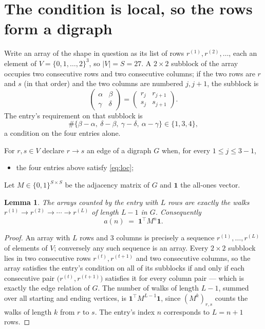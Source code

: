 \documentclass[11pt,a4paper]{article}
\theoremstyle{plain}
\newtheorem{lemma}[theorem]{Lemma}
\theoremstyle{definition}
\begin{document}
\section{The condition is local, so the rows form a digraph}

Write an array of the shape in question as its list of rows
$r^{(1)},r^{(2)},\dots$, each an element of
$V=\{0,1,\dots,2\}^{3}$, so $|V|=S=27$. A $2\times2$ subblock of the array
occupies two consecutive rows and two consecutive columns; if the two rows are $r$
and $s$ (in that order) and the two columns are numbered $j,j+1$,
the subblock is
\[
\begin{pmatrix}\alpha&\beta\\\gamma&\delta\end{pmatrix}=\begin{pmatrix}r_j&r_{j+1}\\s_j&s_{j+1}\end{pmatrix}.
\]
The entry's requirement on that subblock is
\begin{equation}\label{eq:loc}
\#\{\beta-\alpha,\ \delta-\beta,\ \gamma-\delta,\ \alpha-\gamma\}\in\{1,3,4\},
\end{equation}
a condition on the four entries alone.

For $r,s\in V$ declare $r\to s$ an edge of a digraph $G$ when, for every
$1\le j\le 3-1$,
\begin{itemize}
\item the four entries above satisfy \eqref{eq:loc};

\end{itemize}
Let $M\in\{0,1\}^{S\times S}$ be the adjacency matrix of $G$ and $\mathbf{1}$ the
all-ones vector.

\begin{lemma}\label{lem:walk}
The arrays counted by the entry with $L$ rows are exactly the walks
$r^{(1)}\to r^{(2)}\to\cdots\to r^{(L)}$ of length $L-1$ in $G$. Consequently
\[
a(n)\;=\;\mathbf{1}^{\!\top}M^{n}\mathbf{1} .
\]
\end{lemma}

\begin{proof}
An array with $L$ rows and $3$ columns is precisely a sequence
$r^{(1)},\dots,r^{(L)}$ of elements of $V$; conversely any such sequence is an array.
Every $2\times2$ subblock lies in two consecutive rows $r^{(t)},r^{(t+1)}$ and two
consecutive columns, so the array satisfies the entry's condition on all of its subblocks
if and only if each consecutive pair $\bigl(r^{(t)},r^{(t+1)}\bigr)$ satisfies it for
every column pair --- which is exactly the edge relation of $G$. The number of walks of
length $L-1$, summed over all starting and ending vertices, is
$\mathbf{1}^{\!\top}M^{L-1}\mathbf{1}$, since $(M^{k})_{r,s}$ counts the walks of
length $k$ from $r$ to $s$. The entry's index $n$ corresponds to $L=n+1$ rows.
\end{proof}
\end{document}
